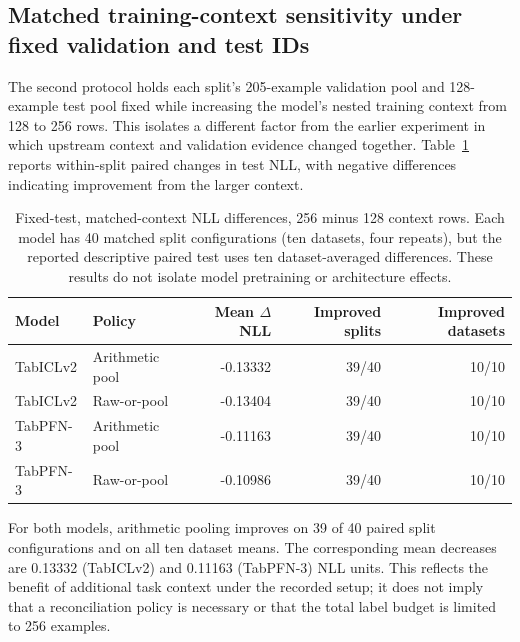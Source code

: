 \documentclass[a4paper,fleqn]{cas-sc}
\begin{document}
\subsection{Matched training-context sensitivity under fixed validation and test IDs}
\label{sec:context}
The second protocol holds each split's 205-example validation pool and 128-example test pool fixed while increasing the model's nested training context from 128 to 256 rows. This isolates a different factor from the earlier experiment in which upstream context and validation evidence changed together. Table~\ref{tab:fixedcontext} reports within-split paired changes in test NLL, with negative differences indicating improvement from the larger context.
\begin{table}[t]
\centering
\caption{Fixed-test, matched-context NLL differences, 256 minus 128 context rows. Each model has 40 matched split configurations (ten datasets, four repeats), but the reported descriptive paired test uses ten dataset-averaged differences. These results do not isolate model pretraining or architecture effects.}
\label{tab:fixedcontext}
\begin{tabular}{llrrr}
\toprule
Model & Policy & Mean $\Delta$NLL & Improved splits & Improved datasets\\
\midrule
TabICLv2 & Arithmetic pool & -0.13332 & 39/40 & 10/10\\
TabICLv2 & Raw-or-pool & -0.13404 & 39/40 & 10/10\\
TabPFN-3 & Arithmetic pool & -0.11163 & 39/40 & 10/10\\
TabPFN-3 & Raw-or-pool & -0.10986 & 39/40 & 10/10\\
\bottomrule
\end{tabular}
\end{table}
For both models, arithmetic pooling improves on 39 of 40 paired split configurations and on all ten dataset means. The corresponding mean decreases are 0.13332 (TabICLv2) and 0.11163 (TabPFN-3) NLL units. This reflects the benefit of additional task context under the recorded setup; it does not imply that a reconciliation policy is necessary or that the total label budget is limited to 256 examples.
\end{document}
